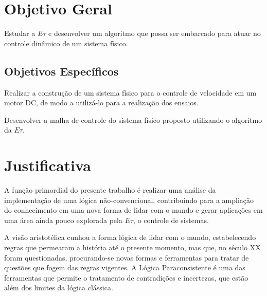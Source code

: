 \section{Objetivo Geral}
Estudar a $E\tau$ e desenvolver um algoritmo 
que possa ser embarcado para 
atuar no controle dinâmico de um sistema físico.




\subsection{Objetivos Específicos}


Realizar a construção de um sistema físico para 
o controle de velocidade em um motor DC, 
de modo a utilizá-lo para a realização dos ensaios.


Desenvolver a malha de controle do sistema físico proposto utilizando o algorítmo da $E\tau$.




\section{Justificativa}



A função primordial do presente trabalho é 
realizar uma análise da implementação de uma lógica não-convencional, 
contribuindo para a ampliação do conhecimento em 
uma nova forma de lidar com o mundo e
gerar aplicações em uma área ainda pouco explorada pela $E\tau$, 
o controle de sistemas. 


A visão aristotélica cunhou a forma lógica de lidar com o mundo, 
estabelecendo regras que permearam a história até o presente momento,
mas que, no século XX foram questionadas, 
procurando-se novas formas e ferramentas para 
tratar de questões que fogem das regras vigentes. 
A Lógica Paraconsistente é uma das ferramentas que 
permite o tratamento de contradições e incertezas,
que estão além dos limites da lógica clássica.

